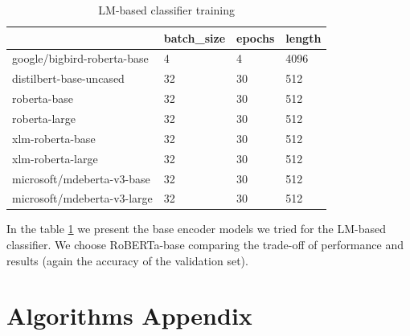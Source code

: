\documentclass[11pt]{article}
\begin{document}
	\begin{table}[]
		\small
		\caption{LM-based classifier training}
		\begin{tabular}{@{}l|lll@{}}
			\toprule
			& \multicolumn{1}{l|}{batch\_size} & \multicolumn{1}{l|}{epochs} & \multicolumn{1}{l|}{length} \\ \midrule
			\multicolumn{1}{|l|}{google/bigbird-roberta-base} & 4                                & 4                           & 4096                             \\ \cmidrule(r){1-1}
			\multicolumn{1}{|l|}{distilbert-base-uncased}     & 32                               & 30                          & 512                              \\ \cmidrule(r){1-1}
			\multicolumn{1}{|l|}{roberta-base}                & 32                               & 30                          & 512                              \\ 
			\cmidrule(r){1-1}
			\multicolumn{1}{|l|}{roberta-large}                & 32                               & 30                          & 512                              \\ 
			\cmidrule(r){1-1}
			\multicolumn{1}{|l|}{xlm-roberta-base}            & 32                               & 30                          & 512                              \\ \cmidrule(r){1-1}
			\multicolumn{1}{|l|}{xlm-roberta-large}           & 32                               & 30                          & 512                              \\ \cmidrule(r){1-1}
			\multicolumn{1}{|l|}{microsoft/mdeberta-v3-base}  & 32                               & 30                          & 512                              \\ \cmidrule(r){1-1}
			\multicolumn{1}{|l|}{microsoft/mdeberta-v3-large} & 32                               & 30                          & 512                              \\ \bottomrule
		\end{tabular}
		\label{table:3}
	\end{table}
	
	In the table \ref{table:3} we present the base encoder models we tried for the LM-based classifier.  We choose RoBERTa-base comparing the trade-off of performance and results (again the accuracy of the validation set).
	
	\section{Algorithms  Appendix}
	\label{sec:appendix}
	
	
\end{document}
